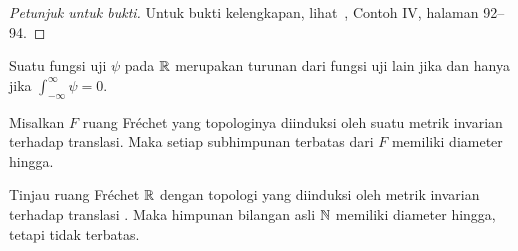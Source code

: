\begin{proof}[\emph{Petunjuk untuk bukti}] Untuk bukti kelengkapan, lihat~\cite{Treves:1967}, Contoh IV, halaman 92--94. \ns
\end{proof}

\begin{prop} Suatu fungsi uji $\psi$ pada $\mathbb{R}$ merupakan turunan dari fungsi uji lain jika dan hanya jika $\int_{-\infty}^\infty\psi = 0$.
\end{prop}

\begin{prop} Misalkan $F$ ruang Fr\'echet yang topologinya diinduksi oleh suatu metrik invarian terhadap translasi. Maka setiap subhimpunan terbatas
dari $F$ memiliki diameter hingga.
\end{prop}

\begin{exam} Tinjau ruang Fr\'echet $\mathbb{R}$ dengan topologi yang diinduksi oleh metrik invarian terhadap translasi
. Maka himpunan bilangan asli $\mathbb{N}$ memiliki diameter hingga, tetapi tidak terbatas.
\end{exam}




































\endinput

